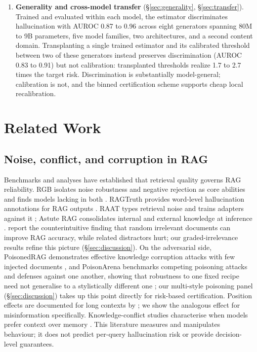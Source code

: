 \documentclass[sn-basic]{sn-jnl}
\theoremstyle{thmstyleone}
\theoremstyle{thmstyletwo}
\begin{document}
\begin{enumerate}
and a label-free deployment monitor flags the anomaly directly.
\item \textbf{Generality and cross-model transfer}
(\S\ref{sec:generality}, \S\ref{sec:transfer}). Trained and evaluated
within each model, the estimator discriminates hallucination with AUROC
0.87 to 0.96 across eight generators spanning 80M to 9B parameters, five
model families, two architectures, and a second content domain.
Transplanting a single trained estimator and its calibrated threshold
between two of these generators instead preserves discrimination (AUROC
0.83 to 0.91) but not calibration: transplanted thresholds realize 1.7 to
2.7 times the target risk. Discrimination is substantially model-general;
calibration is not, and the binned certification scheme supports cheap
local recalibration.
\end{enumerate}

\section{Related Work}\label{sec:related}

\subsection{Noise, conflict, and corruption in RAG}
Benchmarks and analyses have established that retrieval quality governs
RAG reliability. RGB isolates noise robustness and negative rejection
as core abilities and finds models lacking in both
\citep{chen2023rgb}. RAGTruth provides word-level hallucination
annotations for RAG outputs \citep{wu2024ragtruth}. RAAT types
retrieval noise and trains adapters against it \citep{fang2024raat};
Astute RAG consolidates internal and external knowledge at inference
\citep{wang2024astuterag}. \citet{cuconasu2024power} report the
counterintuitive finding that random irrelevant documents can improve
RAG accuracy, while related distractors hurt; our graded-irrelevance
results refine this picture (\S\ref{sec:discussion}). On the
adversarial side, PoisonedRAG demonstrates effective knowledge
corruption attacks with few injected documents
\citep{zou2025poisonedrag}, and PoisonArena benchmarks competing
poisoning attacks and defenses against one another, showing that
robustness to one fixed recipe need not generalise to a stylistically
different one \citep{chen2025poisonarena}; our multi-style poisoning
panel (\S\ref{sec:discussion}) takes up this point directly for
risk-based certification. Position effects are documented for long
contexts by \citet{liu2024lost}; we show the analogous effect for
misinformation specifically. Knowledge-conflict studies characterise
when models prefer context over memory
\citep{xie2024adaptive,kortukov2024conflicts,xu2024survey}. This
literature measures and manipulates behaviour; it does not predict
per-query hallucination risk or provide decision-level guarantees.
\end{document}
